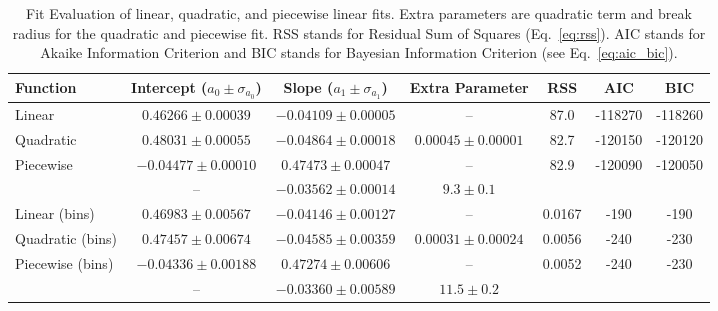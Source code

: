 
\begin{table*}
\caption{
Fit Evaluation of linear, quadratic, and piecewise linear fits.
Extra parameters are quadratic term and break radius for the quadratic and piecewise fit.
RSS stands for Residual Sum of Squares (Eq.~\ref{eq:rss}).
AIC stands for Akaike Information Criterion and BIC stands for Bayesian Information Criterion (see Eq.~\ref{eq:aic_bic}).
}
\label{tab:global_fit_results_comparison}
\begin{tabularx}{\textwidth}{lCCCccc}
\hline
Function & Intercept ($a_0 \pm \sigma_{a_0}$) & Slope ($a_1 \pm \sigma_{a_1}$) & Extra Parameter & RSS & AIC & BIC \\
\hline
Linear & $0.46266 \pm 0.00039$  & $-0.04109 \pm 0.00005$ & -- & 87.0 & -118270  & -118260 \\ 
Quadratic & $0.48031 \pm 0.00055$  & $-0.04864 \pm 0.00018$ & $0.00045 \pm 0.00001$ & 82.7 & -120150  & -120120 \\ 
Piecewise & $-0.04477 \pm 0.00010$ & $0.47473 \pm 0.00047$ & -- & 82.9 & -120090  & -120050 \\ 
 & -- & $-0.03562 \pm 0.00014$ & $9.3 \pm 0.1$ & & & \\ 
\hline
Linear (bins)& $0.46983 \pm 0.00567$  & $-0.04146 \pm 0.00127$ & -- & 0.0167 & -190  & -190 \\ 
Quadratic (bins) & $0.47457 \pm 0.00674$  & $-0.04585 \pm 0.00359$ & $0.00031 \pm 0.00024$ & 0.0056 & -240  & -230 \\ 
Piecewise (bins) & $-0.04336 \pm 0.00188$ & $0.47274 \pm 0.00606$ & -- & 0.0052 & -240  & -230 \\ 
 & -- & $-0.03360 \pm 0.00589$ & $11.5 \pm 0.2$ & & & \\ 
\hline
\end{tabularx}
\end{table*}
